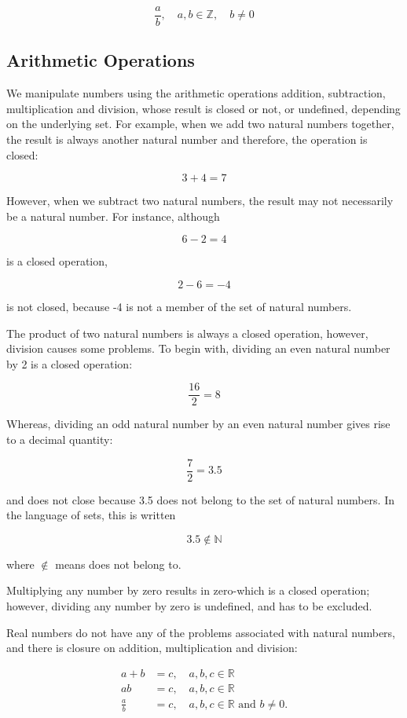\documentclass[10pt]{article}
\begin{document}
$$
\frac{a}{b}, \quad a, b \in \mathbb{Z}, \quad b \neq 0
$$

\subsection{Arithmetic Operations}
We manipulate numbers using the arithmetic operations addition, subtraction, multiplication and division, whose result is closed or not, or undefined, depending on the underlying set. For example, when we add two natural numbers together, the result is always another natural number and therefore, the operation is closed:

$$
3+4=7
$$

However, when we subtract two natural numbers, the result may not necessarily be a natural number. For instance, although

$$
6-2=4
$$

is a closed operation,

$$
2-6=-4
$$

is not closed, because -4 is not a member of the set of natural numbers.

The product of two natural numbers is always a closed operation, however, division causes some problems. To begin with, dividing an even natural number by 2 is a closed operation:

$$
\frac{16}{2}=8
$$

Whereas, dividing an odd natural number by an even natural number gives rise to a decimal quantity:

$$
\frac{7}{2}=3.5
$$

and does not close because 3.5 does not belong to the set of natural numbers. In the language of sets, this is written

$$
3.5 \notin \mathbb{N}
$$

where $\notin$ means does not belong to.

Multiplying any number by zero results in zero-which is a closed operation; however, dividing any number by zero is undefined, and has to be excluded.

Real numbers do not have any of the problems associated with natural numbers, and there is closure on addition, multiplication and division:

$$
\begin{aligned}
a+b & =c, \quad a, b, c \in \mathbb{R} \\
a b & =c, \quad a, b, c \in \mathbb{R} \\
\frac{a}{b} & =c, \quad a, b, c \in \mathbb{R} \text { and } b \neq 0 .
\end{aligned}
$$
\end{document}
